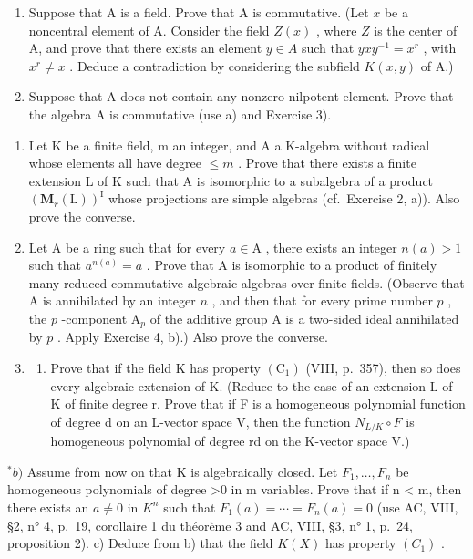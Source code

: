 \begin{enumerate}
\def\labelenumi{\alph{enumi})}
\item
  Suppose that A is a field. Prove that A is commutative. (Let \(x\) be a noncentral element of A. Consider the field \(Z(x)\) , where \(Z\) is the center of A, and prove that there exists an element \(y \in A\) such that \(yxy^{-1} = x^r\) , with \(x^r \neq x\) . Deduce a contradiction by considering the subfield \(K(x,y)\) of A.)
\item
  Suppose that A does not contain any nonzero nilpotent element. Prove that the algebra A is commutative (use a) and Exercise 3).
\end{enumerate}

\begin{enumerate}
\def\labelenumi{\arabic{enumi})}
\setcounter{enumi}{4}
\item
  Let K be a finite field, m an integer, and A a K-algebra without radical whose elements all have degree \(\leqslant m\) . Prove that there exists a finite extension L of K such that A is isomorphic to a subalgebra of a product \((\mathbf{M}_{r}(\mathrm{L}))^{\mathrm{I}}\) whose projections are simple algebras (cf.~Exercise 2, a)). Also prove the converse.
\item
  Let A be a ring such that for every \(a \in \mathrm{A}\) , there exists an integer \(n(a) > 1\) such that \(a^{n(a)} = a\) . Prove that A is isomorphic to a product of finitely many reduced commutative algebraic algebras over finite fields. (Observe that A is annihilated by an integer \(n\) , and then that for every prime number \(p\) , the \(p\) -component \(\mathrm{A}_p\) of the additive group A is a two-sided ideal annihilated by \(p\) . Apply Exercise 4, b).) Also prove the converse.
\item
  \begin{enumerate}
  \def\labelenumii{\alph{enumii})}
  \tightlist
  \item
    Prove that if the field K has property \((\mathrm{C}_{1})\) (VIII, p.~357), then so does every algebraic extension of K. (Reduce to the case of an extension L of K of finite degree r. Prove that if F is a homogeneous polynomial function of degree d on an L-vector space V, then the function \(N_{L/K} \circ F\) is homogeneous polynomial of degree rd on the K-vector space V.)
  \end{enumerate}
\end{enumerate}

\(^{*}b)\) Assume from now on that K is algebraically closed. Let \(F_{1},\ldots,F_{n}\) be homogeneous polynomials of degree \textgreater0 in m variables. Prove that if n \textless{} m, then there exists an \(a \neq 0\) in \(K^{n}\) such that \(F_{1}(a) = \cdots = F_{n}(a) = 0\) (use AC, VIII, §2, n° 4, p.~19, corollaire 1 du théorème 3 and AC, VIII, §3, n° 1, p.~24, proposition 2). c) Deduce from b) that the field \(K(X)\) has property \((C_{1})\) .

